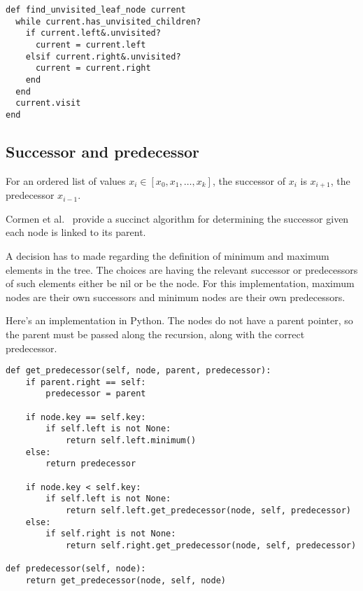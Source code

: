 \documentclass{article}
\begin{document}
\begin{lstlisting}[frame=single,title=Find the deepest leftmost unvisited node relative to current.]
def find_unvisited_leaf_node current
  while current.has_unvisited_children?
    if current.left&.unvisited?
      current = current.left
    elsif current.right&.unvisited?
      current = current.right
    end
  end
  current.visit
end
\end{lstlisting}

\subsection{Successor and predecessor}

\setcounter{sno}{0}

\sno For an ordered list of values $x_i \in [x_0, x_1,\ldots,x_k]$, the successor of
$x_i$ is $x_{i+1}$, the predecessor $x_{i-1}$.

\sno Cormen et al.~\cite[p. 248-249]{cormen:th:1990} provide a succinct algorithm for
determining the successor given each node is linked to its parent.

\sno A decision has to made regarding the definition of minimum and maximum
elements in the tree. \sno The choices are having the relevant successor or
predecessors of such elements either be nil or be the node. \sno For this implementation,
maximum nodes are their own successors and minimum nodes are their
own predecessors.

\sno Here's an implementation in Python. \sno The nodes do not have a parent
pointer, so the parent must be passed along the recursion, along with
the correct predecessor.

\begin{lstlisting}[frame=single]
def get_predecessor(self, node, parent, predecessor):
    if parent.right == self:
        predecessor = parent

    if node.key == self.key:
        if self.left is not None:
            return self.left.minimum()
    else:
        return predecessor

    if node.key < self.key:
        if self.left is not None:
            return self.left.get_predecessor(node, self, predecessor)
    else:
        if self.right is not None:
            return self.right.get_predecessor(node, self, predecessor)

def predecessor(self, node):
    return get_predecessor(node, self, node)
\end{lstlisting}
\end{document}
